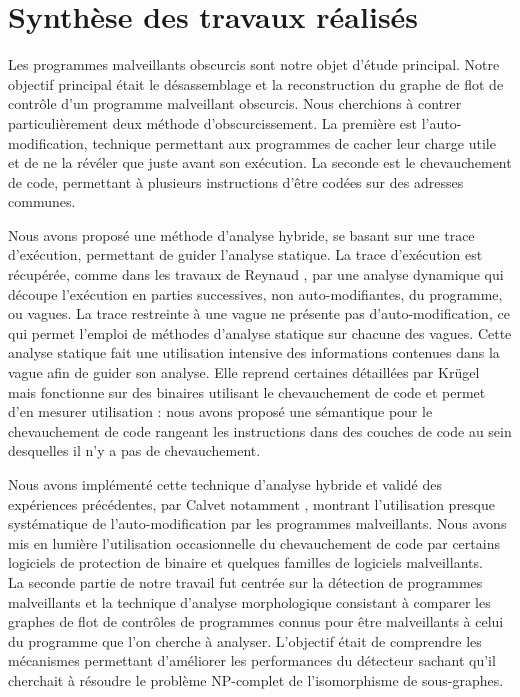 \section*{Synthèse des travaux réalisés}

Les programmes malveillants obscurcis sont notre objet d'étude principal.
Notre objectif principal était le désassemblage et la reconstruction du graphe de flot de contrôle d'un programme malveillant obscurcis.
Nous cherchions à contrer particulièrement deux méthode d'obscurcissement. 
La première est l'auto-modification, technique permettant aux programmes de cacher leur charge utile et de ne la révéler que juste avant son exécution. La seconde est le chevauchement de code, permettant à plusieurs instructions d'être codées sur des adresses communes.

Nous avons proposé une méthode d'analyse hybride, se basant sur une trace d'exécution, permettant de guider l'analyse statique.
La trace d'exécution est récupérée, comme dans les travaux de Reynaud \cite{Reynaud2010}, par une analyse dynamique qui découpe l'exécution en parties successives, non auto-modifiantes, du programme, ou vagues.
La trace restreinte à une vague ne présente pas d'auto-modification, ce qui permet l'emploi de méthodes d'analyse statique sur chacune des vagues.
Cette analyse statique fait une utilisation intensive des informations contenues dans la vague afin de guider son analyse.
Elle reprend certaines détaillées par Krügel \cite{KruegelRVV04} mais fonctionne sur des binaires utilisant le chevauchement de code et permet d'en mesurer utilisation : nous avons proposé une sémantique pour le chevauchement de code rangeant les instructions dans des couches de code au sein desquelles il n'y a pas de chevauchement.

Nous avons implémenté cette technique d'analyse hybride et validé des expériences précédentes, par Calvet notamment \cite{Calvet2013}, montrant l'utilisation presque systématique de l'auto-modification par les programmes malveillants.
Nous avons mis en lumière l'utilisation occasionnelle du chevauchement de code par certains logiciels de protection de binaire et quelques familles de logiciels malveillants.
\\

La seconde partie de notre travail fut centrée sur la détection de programmes malveillants et la technique d'analyse morphologique \cite{BKM08} consistant à comparer les graphes de flot de contrôles de programmes connus pour être malveillants à celui du programme que l'on cherche à analyser.
L'objectif était de comprendre les mécanismes permettant d'améliorer les performances du détecteur sachant qu'il cherchait à résoudre le problème NP-complet de l'isomorphisme de sous-graphes.

